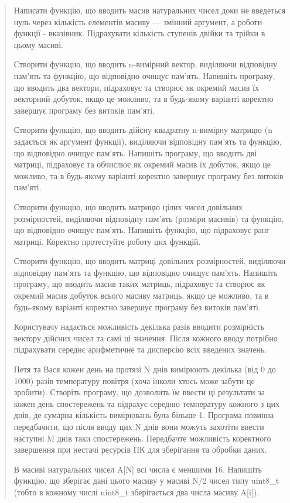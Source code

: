 \documentclass[]{article}
\begin{document}
\begin{quote}
Написати функцію, що вводить масив натуральних чисел доки не введеться
нуль через кількість елементів масиву --- змінний аргумент, а роботи
функції - вказівник. Підрахувати кількість ступенів двійки та трійки в
цьому масиві.

Створити функцію, що вводить n-вимірний вектор, виділяючи відповідну
пам'ять та функцію, що відповідно очищує пам'ять. Напишіть програму, що
вводить два вектори, підраховує та створює як окремий масив їх векторний
добуток, якщо це можливо, та в будь-якому варіанті коректно завершує
програму без витоків пам'яті.

Створити функцію, що вводить дійсну квадратну n-вимірну матрицю (n
задається як аргумент функції), виділяючи відповідну пам'ять та функцію,
що відповідно очищує пам'ять. Напишіть програму, що вводить дві матриці,
підраховує та обчислює як окремий масив їх добуток, якщо це можливо, та
в будь-якому варіанті коректно завершує програму без витоків пам'яті.

Створити функцію, що вводить матрицю цілих чисел довільних розмірностей,
виділяючи відповідну пам'ять (розміри масивів) та функцію, що відповідно
очищує пам'ять. Напишіть функцію, що підраховує ранг матриці. Коректно
протестуйте роботу цих функцій.

Створити функцію, що вводить матриці довільних розмірностей, виділяючи
відповідну пам'ять та функцію, що відповідно очищує пам'ять. Напишіть
програму, що вводить масив таких матриць, підраховує та створює як
окремий масив добуток всього масиву матриць, якщо це можливо, та в
будь-якому варіанті коректно завершує програму без витоків пам'яті.

Користувачу надається можливість декілька разів вводити розмірність
вектору дійсних чисел та самі ці значення. Після кожного вводу потрібно
підрахувати середнє арифметичне та дисперсію всіх введених значень.

Петя та Вася кожен день на протязі
\protect\hypertarget{__DdeLink__55546_11145444801}{}{}N днів вимірюють
декілька (від 0 до 1000) разів температуру повітря (хоча інколи хтось
може забути це зробити). Створіть програму, що дозволить їм ввести ці
результати за кожен день спостережень та підрахує середню температуру
кожного з цих днів, де сумарна кількість вимірювань була більше 1.
Програма повинна передбачити, що після вводу цих N днів вони можуть
захотіти ввести наступні M днів таки спостережень. Передбачте можливість
коректного завершення при нестачі ресурсів ПК для зберігання та обробки
даних.

В масиві натуральних чисел A{[}N{]} всі числа є меншими 16. Напишіть
функцію, що зберігає дані цього масиву у масиві N/2 чисел типу uint8\_t
(тобто в кожному числі uint8\_t зберігається два числа масиву A{[}i{]}).


\end{quote}
\end{document}
